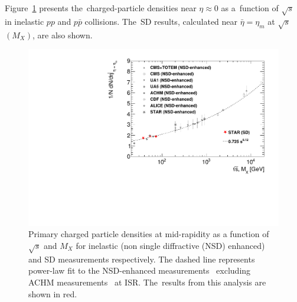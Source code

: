 Figure~\ref{fig:comparison_eta} presents the~charged-particle densities near $\eta\approx 0$ as a~function of $\sqrt{s}$ in inelastic $pp$ and $p\bar{p}$ collisions. The~SD results, calculated near $\bar{\eta}=\eta_{m}$ at $\sqrt{s}$ $(M_X)$, are also shown.  
\begin{figure}[b!]
	\centering
	\includegraphics[width=1\textwidth,page=1]{chapters/discussion/img/dNdeta_sqrtsnoInelastic.pdf}
	\vspace{-0.3cm}
	\caption{Primary charged particle densities at mid-rapidity as a function of $\sqrt{s}$ and $M_X$ for inelastic (non single diffractive (NSD) enhanced)~\cite{CMS:intro_3,UA1:intro_1,UA5:comparison,ISR:comparison,CDF:intro_2,ALICE:comparison,STAR:spectra,CMS:intro_1} and SD measurements respectively. The dashed line represents power-law fit to the NSD-enhanced measurements~\cite{CMS:intro_3} excluding ACHM measurements~\cite{ISR:comparison} at ISR. The~results from this analysis are shown in red. }
	\label{fig:comparison_eta}
\end{figure}

 



 

